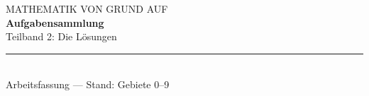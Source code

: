 \documentclass[11pt,a4paper,twoside]{book}
\begin{document}
\thispagestyle{empty}
\vspace*{30mm}
{\sffamily\small\color{grau}MATHEMATIK VON GRUND AUF}\\[8pt]
{\Huge\bfseries\color{tief}Aufgabensammlung}\\[10pt]
{\Large\color{grau}Teilband 2: Die Lösungen}\\[22pt]
{\color{linie}\rule{\textwidth}{0.6pt}}\\[14pt]
{\small\color{grau}Arbeitsfassung --- Stand: Gebiete 0--9}
\cleardoublepage
\tableofcontents
\cleardoublepage
\renewcommand{\chaptername}{}

\cleardoublepage

\cleardoublepage

\cleardoublepage

\cleardoublepage

\cleardoublepage

\cleardoublepage

\cleardoublepage

\cleardoublepage

\cleardoublepage

\cleardoublepage

\end{document}

